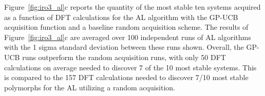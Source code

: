 %
Figure~\ref{fig:iro3_al}c reports the quantity of the most stable ten systems acquired as a function of DFT calculations for the AL algorithm with the GP-UCB acquisition function and a baseline random acquisition scheme.
%
The results of Figure~\ref{fig:iro3_al}c are averaged over 100 independent runs of AL algorithms with the 1 sigma standard deviation between these runs shown.
%
Overall, the GP-UCB runs outperform the random acquisition runs, with only \num{50} DFT calculations on average needed to discover \num{7} of the \num{10} most stable systems.
%
This is compared to the \num{157} DFT calculations needed to discover \num{7/10} most stable polymorphs for the AL utilizing a random acquisition.


